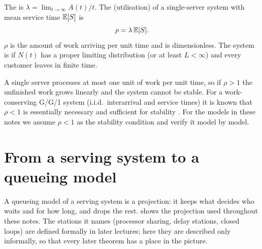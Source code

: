 \begin{definition}\label{def:load}
The  is $\lambda=\lim_{t\to\infty}A(t)/t$.
The  (utilisation) of a single-server system with mean service time
$\mathbb{E}[S]$ is
\[
  \rho=\lambda\,\mathbb{E}[S].
\]
$\rho$ is the amount of work arriving per unit time and is dimensionless.
The system is  if $N(t)$ has a proper limiting distribution (or at least
$L<\infty$) and every customer leaves in finite time.
\end{definition}

A single server processes at most one unit of work per unit time, so if $\rho>1$ the
unfinished work grows linearly and the system cannot be stable. For a work-conserving
G/G/1 system (i.i.d.\ interarrival and service times) it is known that $\rho<1$ is
essentially necessary and sufficient for stability \cite{loynes1962}. For the models
in these notes we assume $\rho<1$ as the stability condition and verify it model by
model.

\section{From a serving system to a queueing model}\label{L1:sec:projection}

A queueing model of a serving system is a projection: it keeps what decides who waits
and for how long, and drops the rest.  shows the projection used
throughout these notes. The stations it names (processor sharing, delay stations,
closed loops) are defined formally in later lectures; here they are described only
informally, so that every later theorem has a place in the picture.

